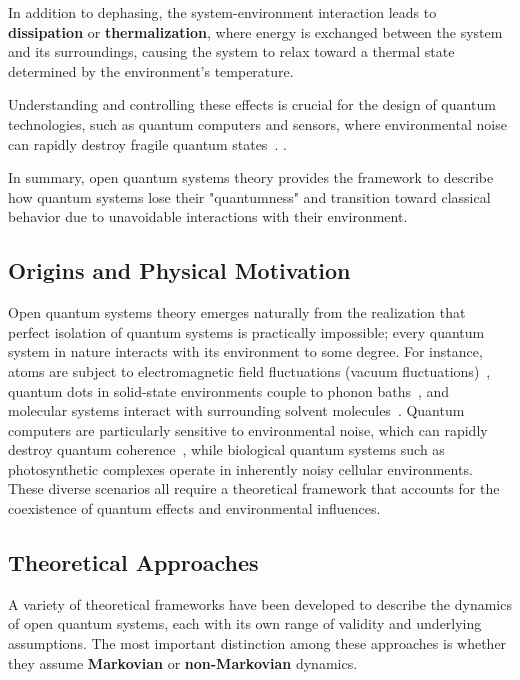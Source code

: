 In addition to dephasing, the system-environment interaction leads to \textbf{dissipation} or \textbf{thermalization}, where energy is exchanged between the system and its surroundings, causing the system to relax toward a thermal state determined by the environment's temperature.

Understanding and controlling these effects is crucial for the design of quantum technologies, such as quantum computers and sensors, where environmental noise can rapidly destroy fragile quantum states~\cite{laddetal2010quantumcomputers}.  .%

In summary, open quantum systems theory provides the framework to describe how quantum systems lose their "quantumness" and transition toward classical behavior due to unavoidable interactions with their environment.

\subsection{Origins and Physical Motivation}

Open quantum systems theory emerges naturally from the realization that perfect isolation of quantum systems is practically impossible; every quantum system in nature interacts with its environment to some degree. For instance, atoms are subject to electromagnetic field fluctuations (vacuum fluctuations)~\cite{breuerpetruccione2009theoryopenquantum}, quantum dots in solid-state environments couple to phonon baths~\cite{weiss2012quantumdissipativesystems}, and molecular systems interact with surrounding solvent molecules~\cite{mukamel1995principlesnonlinearoptical}. Quantum computers are particularly sensitive to environmental noise, which can rapidly destroy quantum coherence~\cite{laddetal2010quantumcomputers}, while biological quantum systems such as photosynthetic complexes operate in inherently noisy cellular environments.%
These diverse scenarios all require a theoretical framework that accounts for the coexistence of quantum effects and environmental influences.


\subsection{Theoretical Approaches}

A variety of theoretical frameworks have been developed to describe the dynamics of open quantum systems, each with its own range of validity and underlying assumptions. The most important distinction among these approaches is whether they assume \textbf{Markovian} or \textbf{non-Markovian} dynamics.

